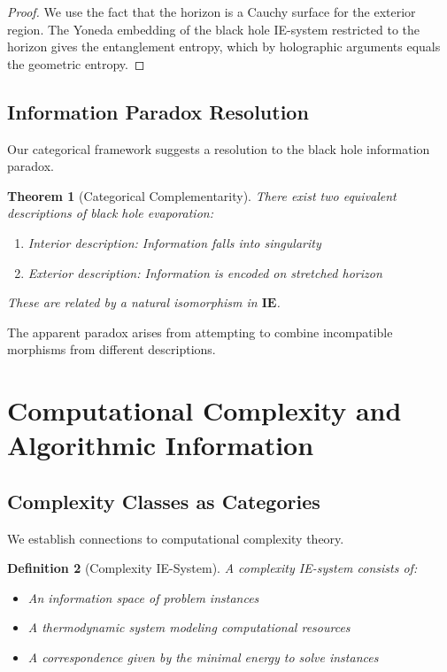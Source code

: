 \documentclass[12pt]{article}
\newtheorem{theorem}{Theorem}[section]
\newtheorem{definition}[theorem]{Definition}
\begin{document}
\begin{proof}
We use the fact that the horizon is a Cauchy surface for the exterior region. The Yoneda embedding of the black hole IE-system restricted to the horizon gives the entanglement entropy, which by holographic arguments equals the geometric entropy.
\end{proof}

\subsection{Information Paradox Resolution}

Our categorical framework suggests a resolution to the black hole information paradox.

\begin{theorem}[Categorical Complementarity]
There exist two equivalent descriptions of black hole evaporation:
\begin{enumerate}
\item Interior description: Information falls into singularity
\item Exterior description: Information is encoded on stretched horizon
\end{enumerate}
These are related by a natural isomorphism in $\mathbf{IE}$.
\end{theorem}

The apparent paradox arises from attempting to combine incompatible morphisms from different descriptions.

\section{Computational Complexity and Algorithmic Information}

\subsection{Complexity Classes as Categories}

We establish connections to computational complexity theory.

\begin{definition}[Complexity IE-System]
A complexity IE-system consists of:
\begin{itemize}
\item An information space of problem instances
\item A thermodynamic system modeling computational resources
\item A correspondence given by the minimal energy to solve instances
\end{itemize}
\end{definition}
\end{document}
